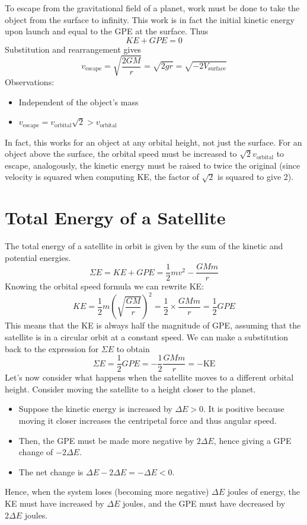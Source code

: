 \documentclass[a4paper,12pt]{article}
\let\oldsection\section
\renewcommand\section{\clearpage\oldsection}
\newcommand{\paren}[1]{\left(#1\right)}
\begin{document}
To escape from the gravitational field of a planet, work must be done to take the object from the surface to infinity. This work is in fact the initial kinetic energy upon launch and equal to the GPE at the surface. Thus $$KE + GPE = 0$$
Substitution and rearrangement gives \begin{equation}\label{eq:escape_velocity}
  v_{\text{escape}} = \sqrt{\frac{2GM}{r}} = \sqrt{2gr} = \sqrt{-2V_\text{surface}}
\end{equation}
Observations:
\begin{itemize}
  \item Independent of the object's mass
  \item $v_{\text{escape}} = v_\text{orbital}\sqrt{2} > v_{\text{orbital}}$
\end{itemize}
In fact, this works for an object at any orbital height, not just the surface. For an object above the surface, the orbital speed must be increased to $\sqrt{2}v_{\text{orbital}}$ to escape, analogously, the kinetic energy must be raised to twice the original (since velocity is squared when computing KE, the factor of $\sqrt{2}$ is squared to give 2).

\section{Total Energy of a Satellite}

The total energy of a satellite in orbit is given by the sum of the kinetic and potential energies.
$$\Sigma E = KE + GPE = \frac{1}{2}mv^2 - \frac{GMm}{r}$$
Knowing the orbital speed formula we can rewrite KE:
$$KE = \frac{1}{2}m\paren{\sqrt{\frac{GM}{r}}}^2 = \frac{1}{2}\times \frac{GMm}{r} = \frac{1}{2} GPE$$
This means that the KE is always half the magnitude of GPE, assuming that the satellite is in a circular orbit at a constant speed. We can make a substitution back to the expression for $\Sigma E$ to obtain
\begin{equation}\label{eq:total_energy}
  \Sigma E = \frac{1}{2}GPE = -\frac{1}{2} \frac{GMm}{r} = -\text{KE}
\end{equation}
Let's now consider what happens when the satellite moves to a different orbital height. Consider moving the satellite to a height closer to the planet.
\begin{itemize}
  \item Suppose the kinetic energy is increased by $\Delta E > 0$. It is positive because moving it closer increases the centripetal force and thus angular speed.
  \item Then, the GPE must be made more negative by $2\Delta E$, hence giving a GPE change of $-2\Delta E$.
  \item The net change is $\Delta E - 2\Delta E = -\Delta E < 0$.
\end{itemize}
Hence, when the system loses (becoming more negative) $\Delta E$ joules of energy, the KE must have increased by $\Delta E$ joules, and the GPE must have decreased by $2\Delta E$ joules.
\end{document}
